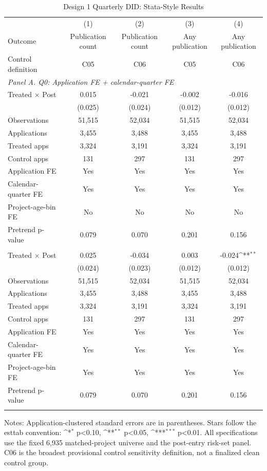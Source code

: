\begin{table}[!htbp]\centering
\def\sym#1{\ifmmode^{#1}\else\(^{#1}\)\fi}
\caption{Design 1 Quarterly DID: Stata-Style Results}
\label{tab:design1_stata_style}
\begin{tabular}{lcccc}
\toprule
 & (1) & (2) & (3) & (4) \\
Outcome & Publication count & Publication count & Any publication & Any publication \\
Control definition & C05 & C06 & C05 & C06 \\
\midrule
\multicolumn{5}{l}{\textit{Panel A. Q0: Application FE + calendar-quarter FE}} \\
Treated $\times$ Post & 0.015 & -0.021 & -0.002 & -0.016 \\
 & (0.025) & (0.024) & (0.012) & (0.012) \\
Observations & 51,515 & 52,034 & 51,515 & 52,034 \\
Applications & 3,455 & 3,488 & 3,455 & 3,488 \\
Treated apps & 3,324 & 3,191 & 3,324 & 3,191 \\
Control apps & 131 & 297 & 131 & 297 \\
Application FE & Yes & Yes & Yes & Yes \\
Calendar-quarter FE & Yes & Yes & Yes & Yes \\
Project-age-bin FE & No & No & No & No \\
Pretrend p-value & 0.079 & 0.070 & 0.201 & 0.156 \\
\addlinespace
\multicolumn{5}{l}{\textit{Panel B. Q1: Q0 + project-age-bin FE}} \\
Treated $\times$ Post & 0.025 & -0.034 & 0.003 & -0.024\sym{**} \\
 & (0.024) & (0.023) & (0.012) & (0.012) \\
Observations & 51,515 & 52,034 & 51,515 & 52,034 \\
Applications & 3,455 & 3,488 & 3,455 & 3,488 \\
Treated apps & 3,324 & 3,191 & 3,324 & 3,191 \\
Control apps & 131 & 297 & 131 & 297 \\
Application FE & Yes & Yes & Yes & Yes \\
Calendar-quarter FE & Yes & Yes & Yes & Yes \\
Project-age-bin FE & Yes & Yes & Yes & Yes \\
Pretrend p-value & 0.079 & 0.070 & 0.201 & 0.156 \\
\addlinespace
\bottomrule
\end{tabular}
\begin{minipage}{0.95\linewidth}
\footnotesize Notes: Application-clustered standard errors are in parentheses. Stars follow the esttab convention: \sym{*} p<0.10, \sym{**} p<0.05, \sym{***} p<0.01. All specifications use the fixed 6,935 matched-project universe and the post-entry risk-set panel. C06 is the broadest provisional control sensitivity definition, not a finalized clean control group.
\end{minipage}
\end{table}
